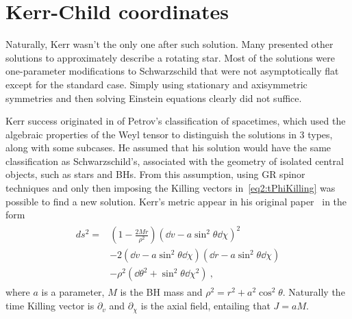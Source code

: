\section{Kerr-Child coordinates}

Naturally, Kerr wasn't the only one after such solution.
Many presented other solutions to approximately describe a rotating star. 
Most of the solutions were one-parameter modifications to Schwarzschild that were not asymptotically flat except for the standard case. 
Simply using stationary and axisymmetric symmetries and then solving Einstein equations clearly did not suffice.

Kerr success originated in of Petrov's classification of spacetimes, which used the algebraic properties of the Weyl tensor to distinguish the solutions in 3 types, along with some subcases.
He assumed that his solution would have the same classification as Schwarzschild's, associated with the geometry of isolated central objects, such as stars and BHs. 
From this assumption, using GR spinor techniques and only then imposing the Killing vectors in~\eqref{eq2:tPhiKilling} was possible to find a new solution. 
Kerr's metric appear in his original paper~\cite{Kerr1963} in the form
\begin{align}
    \begin{split}
        ds^2 = & \left(1 - \frac{2 M r}{\rho^2} \right) (\dd v - a \sin^2\theta \dd \chi )^2 \\
        & - 2  (\dd v - a \sin^2\theta \dd \chi )  (\dd r - a \sin^2\theta \dd \chi ) \\
        & - \rho^2 (\dd \theta^2 + \sin^2\theta \dd \chi^2 ) ~,
    \end{split}
    \label{eq2:KerrIngoingEF}
\end{align}
where $a$ is a parameter, $M$ is the BH mass and $\rho^2 = r^2 + a^2 \cos^2\theta$. Naturally the time Killing vector is $\partial_v$ and $\partial_\chi$ is the axial field, entailing that $J = a M$.

